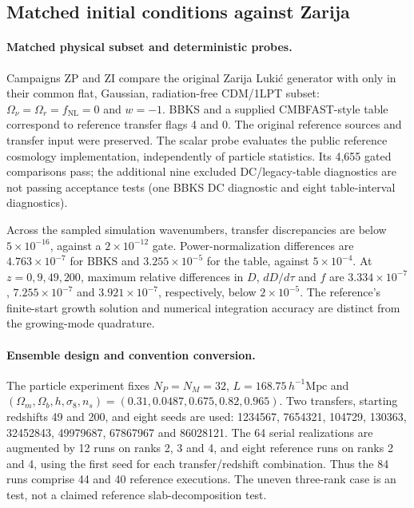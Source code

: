\subsection{Matched initial conditions against Zarija}
\label{app:zarija}

\paragraph{Matched physical subset and deterministic probes.}
Campaigns ZP and ZI compare the original Zarija Luki\'c generator with \IPPL
only in their common flat, Gaussian, radiation-free CDM/1LPT subset:
$\Omega_\nu=\Omega_r=f_{\mathrm{NL}}=0$ and $w=-1$.  BBKS and a supplied
CMBFAST-style table correspond to reference transfer flags 4 and 0.
The original reference sources and transfer input were preserved.
The scalar probe evaluates the public reference cosmology implementation,
independently of particle statistics.  Its 4,655 gated comparisons pass;
the additional nine excluded DC/legacy-table diagnostics are not passing
acceptance tests (one BBKS DC diagnostic and eight table-interval diagnostics).

Across the sampled simulation wavenumbers, transfer discrepancies are below
$5\times10^{-16}$, against a $2\times10^{-12}$ gate.  Power-normalization
differences are $4.763\times10^{-7}$ for BBKS and $3.255\times10^{-5}$ for the
table, against $5\times10^{-4}$.  At $z=0,9,49,200$, maximum relative differences
in $D$, $dD/d\tau$ and $f$ are $3.334\times10^{-7}$,
$7.255\times10^{-7}$ and $3.921\times10^{-7}$, respectively, below
$2\times10^{-5}$.  The reference's finite-start growth solution and numerical
integration accuracy are distinct from the \IPPL growing-mode quadrature.

\paragraph{Ensemble design and convention conversion.}
The particle experiment fixes $N_P=N_M=32$, $L=168.75\,h^{-1}\mathrm{Mpc}$ and
$(\Omega_m,\Omega_b,h,\sigma_8,n_s)=(0.31,0.0487,0.675,0.82,0.965)$.
Two transfers, starting redshifts 49 and 200, and eight seeds are used:
1234567, 7654321, 104729, 130363, 32452843, 49979687, 67867967 and 86028121.
The 64 serial realizations are augmented by 12 \IPPL runs on ranks 2, 3 and 4,
and eight reference runs on ranks 2 and 4, using the first seed for each
transfer/redshift combination.  Thus the 84 runs comprise 44 \IPPL and 40
reference executions.  The uneven three-rank case is an \IPPL test, not a
claimed reference slab-decomposition test.

